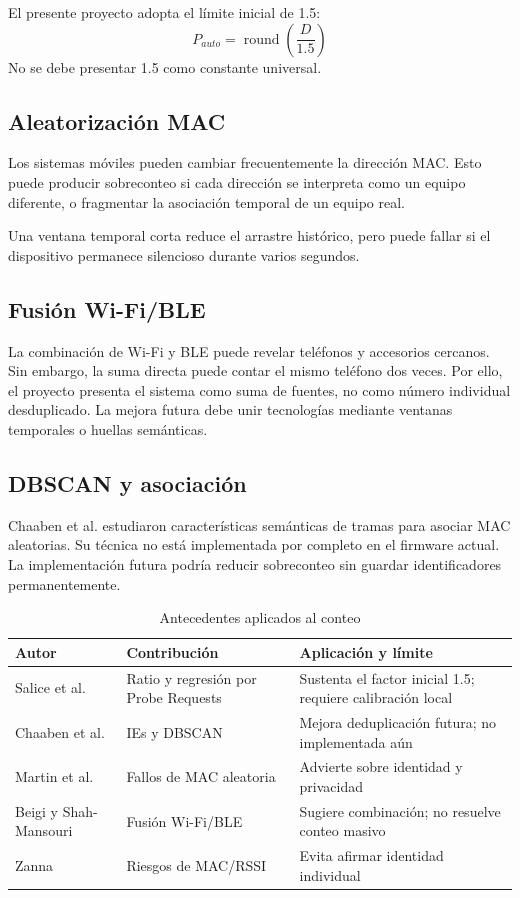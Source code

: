 \documentclass[12pt,a4paper]{article}
\begin{document}
El presente proyecto adopta el límite inicial de 1.5:
\[
P_{auto}=\operatorname{round}\left(\frac{D}{1.5}\right)
\]
No se debe presentar 1.5 como constante universal.

\subsection{Aleatorización MAC}
Los sistemas móviles pueden cambiar frecuentemente la dirección MAC. Esto puede producir sobreconteo si cada dirección se interpreta como un equipo diferente, o fragmentar la asociación temporal de un equipo real.

Una ventana temporal corta reduce el arrastre histórico, pero puede fallar si el dispositivo permanece silencioso durante varios segundos.

\subsection{Fusión Wi-Fi/BLE}
La combinación de Wi-Fi y BLE puede revelar teléfonos y accesorios cercanos. Sin embargo, la suma directa puede contar el mismo teléfono dos veces. Por ello, el proyecto presenta el sistema como suma de fuentes, no como número individual desduplicado. La mejora futura debe unir tecnologías mediante ventanas temporales o huellas semánticas.

\subsection{DBSCAN y asociación}
Chaaben et al. estudiaron características semánticas de tramas para asociar MAC aleatorias. Su técnica no está implementada por completo en el firmware actual. La implementación futura podría reducir sobreconteo sin guardar identificadores permanentemente.

\begin{table}[htbp]
\centering
\caption{Antecedentes aplicados al conteo}
\begin{tabularx}{\textwidth}{@{}p{3cm}p{3.5cm}X@{}}
\toprule
Autor & Contribución & Aplicación y límite \\
\midrule
Salice et al. & Ratio y regresión por Probe Requests & Sustenta el factor inicial 1.5; requiere calibración local \\
Chaaben et al. & IEs y DBSCAN & Mejora deduplicación futura; no implementada aún \\
Martin et al. & Fallos de MAC aleatoria & Advierte sobre identidad y privacidad \\
Beigi y Shah-Mansouri & Fusión Wi-Fi/BLE & Sugiere combinación; no resuelve conteo masivo \\
Zanna & Riesgos de MAC/RSSI & Evita afirmar identidad individual \\
\bottomrule
\end{tabularx}
\end{table}
\end{document}
